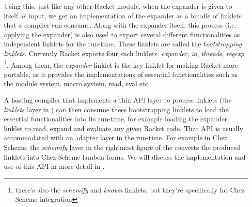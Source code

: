 Using this, just like any other Racket module, when the expander is
given to itself as input, we get an implementation of the expander as
a bundle of linklets that a compiler can consume. Along with the
expander itself, this process (i.e. applying the expander) is also
used to export several different functionalities as independent
linklets for the run-time. These linklets are called the
\emph{bootstrapping linklets}. Currently Racket exports four such
linklets: \emph{expander}, \emph{io}, \emph{threads},
\emph{regexp} \footnote{there's also the \emph{schemify} and
  \emph{known} linklets, but they're specifically for Chez Scheme
  integration}. Among them, the \emph{expander} linklet is the key
linklet for making Racket more portable, as it provides the
implementations of essential functionalities such as the module
system, macro system, read, eval etc.

A hosting compiler that implements a thin API layer to process
linklets (the \emph{linklets} layer in )
can then consume these bootstrapping linklets to load the essential
functionalities into its run-time, for example loading the expander
linklet to read, expand and evaluate any given Racket code. That API
is usually accommodated with an adapter layer in the run-time. For
example in Chez Scheme, the \emph{schemify} layer in the rightmost
figure of the  converts the produced
linklets into Chez Scheme lambda forms. We will discuss the
implementation and use of this API in more detail in
.
